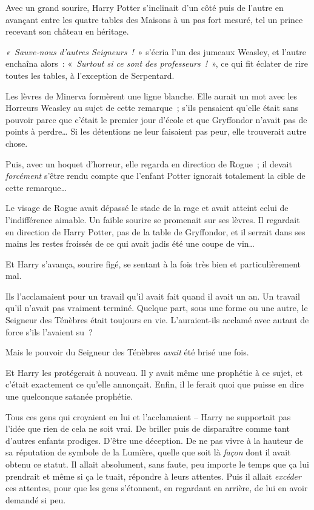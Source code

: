 Avec un grand sourire, Harry Potter s'inclinait d'un côté puis de l'autre en avançant entre les quatre tables des Maisons à un pas fort mesuré, tel un prince recevant son château en héritage.

\emph{«~Sauve-nous d'autres Seigneurs~!}~» s'écria l'un des jumeaux Weasley, et l'autre enchaîna alors~: «~\emph{Surtout si ce sont des professeurs~!}~», ce qui fit éclater de rire toutes les tables, à l'exception de Serpentard.

Les lèvres de Minerva formèrent une ligne blanche. Elle aurait un mot avec les Horreurs Weasley au sujet de cette remarque~; s'ils pensaient qu'elle était sans pouvoir parce que c'était le premier jour d'école et que Gryffondor n'avait pas de points à perdre… Si les détentions ne leur faisaient pas peur, elle trouverait autre chose.

Puis, avec un hoquet d'horreur, elle regarda en direction de Rogue~; il devait \emph{forcément} s'être rendu compte que l'enfant Potter ignorait totalement la cible de cette remarque…

Le visage de Rogue avait dépassé le stade de la rage et avait atteint celui de l'indifférence aimable. Un faible sourire se promenait sur ses lèvres. Il regardait en direction de Harry Potter, pas de la table de Gryffondor, et il serrait dans ses mains les restes froissés de ce qui avait jadis été une coupe de vin…

\later

Et Harry s'avança, sourire figé, se sentant à la fois très bien et particulièrement mal.

Ils l'acclamaient pour un travail qu'il avait fait quand il avait un an. Un travail qu'il n'avait pas vraiment terminé. Quelque part, sous une forme ou une autre, le Seigneur des Ténèbres était toujours en vie. L'auraient-ils acclamé avec autant de force s'ils l'avaient su~?

Mais le pouvoir du Seigneur des Ténèbres \emph{avait} été brisé une fois.

Et Harry les protégerait à nouveau. Il y avait même une prophétie à ce sujet, et c'était exactement ce qu'elle annonçait. Enfin, il le ferait quoi que puisse en dire une quelconque satanée prophétie.

Tous ces gens qui croyaient en lui et l'acclamaient -- Harry ne supportait pas l'idée que rien de cela ne soit vrai. De briller puis de disparaître comme tant d'autres enfants prodiges. D'être une déception. De ne pas vivre à la hauteur de sa réputation de symbole de la Lumière, quelle que soit là \emph{façon} dont il avait obtenu ce statut. Il allait absolument, sans faute, peu importe le temps que ça lui prendrait et même si ça le tuait, répondre à leurs attentes. Puis il allait \emph{excéder} ces attentes, pour que les gens s'étonnent, en regardant en arrière, de lui en avoir demandé si peu.

